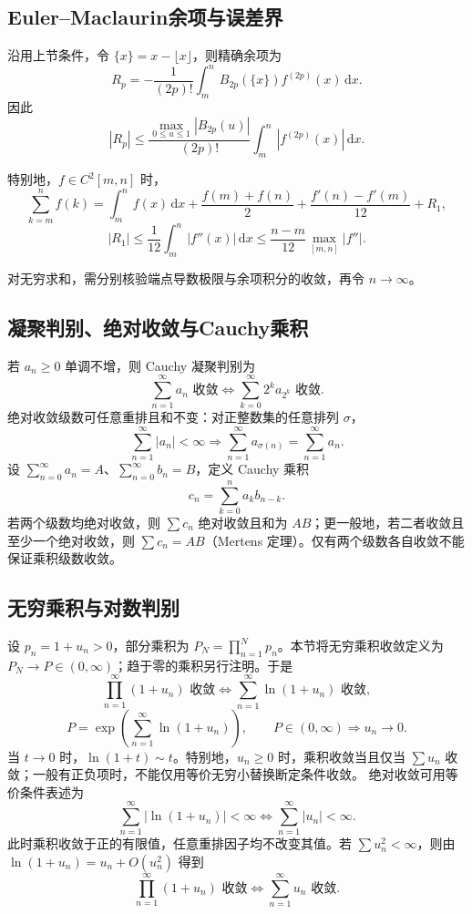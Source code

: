\documentclass[../main.tex]{subfiles}
\begin{document}
\subsection{Euler--Maclaurin余项与误差界}
沿用上节条件，令 $\{x\}=x-\lfloor x\rfloor$，则精确余项为
\[
R_p=-\frac1{(2p)!}\int_m^nB_{2p}(\{x\})f^{(2p)}(x)\,\mathrm dx.
\]
因此
\[
|R_p|\le\frac{\max_{0\le u\le1}|B_{2p}(u)|}{(2p)!}
\int_m^n|f^{(2p)}(x)|\,\mathrm dx.
\]
\par\pagebreak[0]\begin{samepage}
特别地，$f\in C^2[m,n]$ 时，
\[
\sum_{k=m}^nf(k)=\int_m^nf(x)\,\mathrm dx
+\frac{f(m)+f(n)}2+\frac{f'(n)-f'(m)}{12}+R_1,
\]
\[
|R_1|\le\frac1{12}\int_m^n|f''(x)|\,\mathrm dx
\le\frac{n-m}{12}\max_{[m,n]}|f''|.
\]
\par\end{samepage}\pagebreak[0]
对无穷求和，需分别核验端点导数极限与余项积分的收敛，再令 $n\to\infty$。
\subsection{凝聚判别、绝对收敛与Cauchy乘积}
若 $a_n\ge0$ 单调不增，则 Cauchy 凝聚判别为
\[
\sum_{n=1}^\infty a_n\text{ 收敛}
\iff\sum_{k=0}^\infty2^ka_{2^k}\text{ 收敛}.
\]
绝对收敛级数可任意重排且和不变：对正整数集的任意排列 $\sigma$，
\[
\sum_{n=1}^\infty|a_n|<\infty
\Longrightarrow
\sum_{n=1}^\infty a_{\sigma(n)}=\sum_{n=1}^\infty a_n.
\]
设 $\sum_{n=0}^\infty a_n=A$、$\sum_{n=0}^\infty b_n=B$，定义 Cauchy 乘积
\[
c_n=\sum_{k=0}^na_kb_{n-k}.
\]
若两个级数均绝对收敛，则 $\sum c_n$ 绝对收敛且和为 $AB$；更一般地，若二者收敛且至少一个绝对收敛，则 $\sum c_n=AB$（Mertens 定理）。仅有两个级数各自收敛不能保证乘积级数收敛。
\subsection{无穷乘积与对数判别}
设 $p_n=1+u_n>0$，部分乘积为 $P_N=\prod_{n=1}^Np_n$。本节将无穷乘积收敛定义为 $P_N\to P\in(0,\infty)$；趋于零的乘积另行注明。于是
\[
\prod_{n=1}^\infty(1+u_n)\text{ 收敛}
\iff\sum_{n=1}^\infty\ln(1+u_n)\text{ 收敛},
\]
\[
P=\exp\!\left(\sum_{n=1}^\infty\ln(1+u_n)\right),\qquad
P\in(0,\infty)\Longrightarrow u_n\to0.
\]
当 $t\to0$ 时，$\ln(1+t)\sim t$。特别地，$u_n\ge0$ 时，乘积收敛当且仅当 $\sum u_n$ 收敛；一般有正负项时，不能仅用等价无穷小替换断定条件收敛。
绝对收敛可用等价条件表述为
\[
\sum_{n=1}^\infty|\ln(1+u_n)|<\infty
\iff\sum_{n=1}^\infty|u_n|<\infty.
\]
此时乘积收敛于正的有限值，任意重排因子均不改变其值。若 $\sum u_n^2<\infty$，则由 $\ln(1+u_n)=u_n+O(u_n^2)$ 得到
\[
\prod_{n=1}^\infty(1+u_n)\text{ 收敛}
\iff\sum_{n=1}^\infty u_n\text{ 收敛}.
\]
\end{document}
